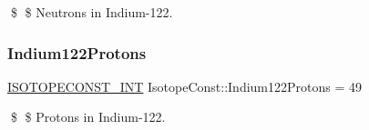 \$ \$ Neutrons in Indium-\/122. \mbox{\label{group___isotope_const-_indium-_in122_ga0504a2ef16b32ef421b52377d92311a5}} 
\subsubsection{\texorpdfstring{Indium122\+Protons}{Indium122Protons}}
{\footnotesize\ttfamily \mbox{\hyperlink{group___isotope_const-_macros_ga5f18360b3e99483a35c32d789e62621c}{I\+S\+O\+T\+O\+P\+E\+C\+O\+N\+S\+T\+\_\+\+I\+NT}} Isotope\+Const\+::\+Indium122\+Protons = 49}

\$ \$ Protons in Indium-\/122. 